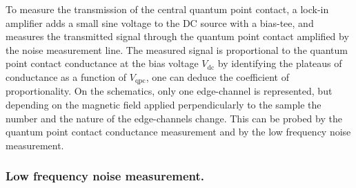 To measure the transmission of the central quantum point contact, a lock-in amplifier adds a small sine voltage to the DC source with a bias-tee, and measures the transmitted signal through the quantum point contact amplified by the noise measurement line.
The measured signal is proportional to the quantum point contact conductance at the bias voltage $V_{\mathrm{dc}}$ by identifying the plateaus of conductance as a function of $V_{\mathrm{qpc}}$, one can deduce the coefficient of proportionality.
On the schematics, only one edge-channel is represented, but depending on the magnetic field applied perpendicularly to the sample the number and the nature of the edge-channels change.
This can be probed by the quantum point contact conductance measurement and by the low frequency noise measurement.

\subsubsection*{Low frequency noise measurement.}

